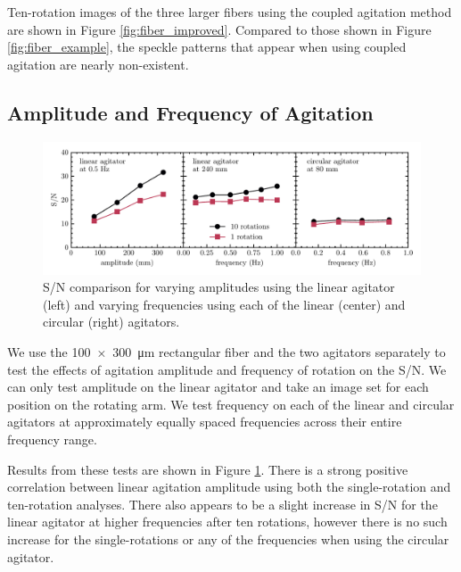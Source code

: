 \documentclass[twocolumn]{emulateapj}
\begin{document}
Ten-rotation images of the three larger fibers using the coupled agitation method are shown in Figure \ref{fig:fiber_improved}. Compared to those shown in Figure \ref{fig:fiber_example}, the speckle patterns that appear when using coupled agitation are nearly non-existent.

\subsection{Amplitude and Frequency of Agitation}
\label{subsec:amp_freq}

\begin{figure}[t]
\centering
	\includegraphics[width=\textwidth]{amp_freq_snr.pdf}
	\caption{S/N comparison for varying amplitudes using the linear agitator (left) and varying frequencies using each of the linear (center) and circular (right) agitators.}
\label{fig:amp_freq_snr}
\end{figure}

We use the \SI{100x300}{\micro\meter} rectangular fiber and the two agitators separately to test the effects of agitation amplitude and frequency of rotation on the S/N. We can only test amplitude on the linear agitator and take an image set for each position on the rotating arm. We test frequency on each of the linear and circular agitators at approximately equally spaced frequencies across their entire frequency range.

Results from these tests are shown in Figure \ref{fig:amp_freq_snr}. There is a strong positive correlation between linear agitation amplitude using both the single-rotation and ten-rotation analyses. There also appears to be a slight increase in S/N for the linear agitator at higher frequencies after ten rotations, however there is no such increase for the single-rotations or any of the frequencies when using the circular agitator.
\end{document}
